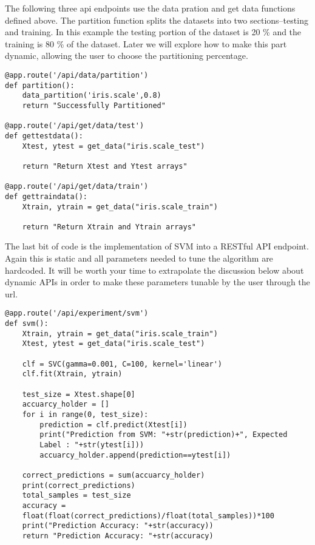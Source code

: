 The following three api endpoints use the data pration and get data
functions defined above. The partition function splits the datasets
into two sections--testing and training. In this example the testing
portion of the dataset is 20 \% and the training is 80 \% of the
dataset. Later we will explore how to make this part dynamic, allowing
the user to choose the partitioning percentage. 

\begin{lstlisting}
@app.route('/api/data/partition')
def partition():
    data_partition('iris.scale',0.8)
    return "Successfully Partitioned"

@app.route('/api/get/data/test')
def gettestdata():
    Xtest, ytest = get_data("iris.scale_test")
    
    return "Return Xtest and Ytest arrays"
    
@app.route('/api/get/data/train')
def gettraindata():
    Xtrain, ytrain = get_data("iris.scale_train")
    
    return "Return Xtrain and Ytrain arrays"
\end{lstlisting} 

The last bit of code is the implementation of SVM into a RESTful API
endpoint. Again this is static and all parameters needed to tune the
algorithm are hardcoded. It will be worth your time to extrapolate
the discussion below about dynamic APIs in order to make these
parameters tunable by the user through the url. 

\begin{lstlisting}
@app.route('/api/experiment/svm')
def svm():
    Xtrain, ytrain = get_data("iris.scale_train")
    Xtest, ytest = get_data("iris.scale_test")

    clf = SVC(gamma=0.001, C=100, kernel='linear')
    clf.fit(Xtrain, ytrain)

    test_size = Xtest.shape[0]
    accuarcy_holder = []
    for i in range(0, test_size):
        prediction = clf.predict(Xtest[i])
        print("Prediction from SVM: "+str(prediction)+", Expected
        Label : "+str(ytest[i]))
        accuarcy_holder.append(prediction==ytest[i])

    correct_predictions = sum(accuarcy_holder)
    print(correct_predictions)
    total_samples = test_size
    accuracy =
    float(float(correct_predictions)/float(total_samples))*100
    print("Prediction Accuracy: "+str(accuracy))
    return "Prediction Accuracy: "+str(accuracy)
\end{lstlisting} 

